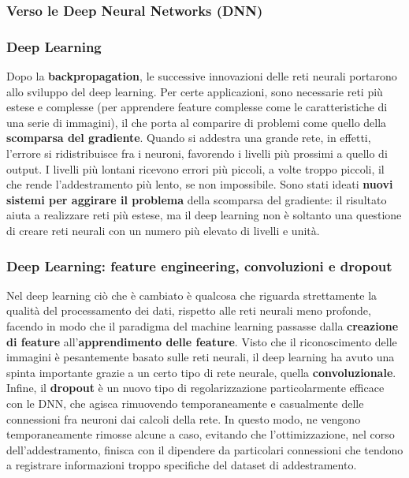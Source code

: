 \subsubsection[Verso le Deep Neural Networks (DNN)]{Verso le Deep Neural Networks (DNN)}
\begin{frame}

	\frametitle{Deep Learning}

	Dopo la \textbf{backpropagation}, le successive innovazioni delle reti neurali portarono allo sviluppo del deep learning.
	\newlinedouble
	Per certe applicazioni, sono necessarie reti più estese e complesse (per apprendere feature complesse come le caratteristiche di una serie di immagini), il che porta al comparire di problemi come quello della \textbf{scomparsa del gradiente}.
	\newlinedouble
	Quando si addestra una grande rete, in effetti, l'errore si ridistribuisce fra i neuroni, favorendo i livelli più prossimi a quello di output. I livelli più lontani ricevono errori più piccoli, a volte troppo piccoli, il che rende l'addestramento più lento, se non impossibile. Sono stati ideati \textbf{nuovi sistemi per aggirare il problema} della scomparsa del gradiente: il risultato aiuta a realizzare reti più estese, ma il deep learning non è soltanto una questione di creare reti neurali con un numero più elevato di livelli e unità.
\end{frame}


\begin{frame}

	\frametitle{Deep Learning: feature engineering, convoluzioni e dropout}

	Nel deep learning ciò che è cambiato è qualcosa che riguarda strettamente la qualità del processamento dei dati, rispetto alle reti neurali meno profonde, facendo in modo che il paradigma del machine learning passasse dalla \textbf{creazione di feature} all'\textbf{apprendimento delle feature}.%
	\newlinedouble
	Visto che il riconoscimento delle immagini è pesantemente basato sulle reti neurali, il deep learning ha avuto una spinta importante grazie a un certo tipo di rete neurale, quella \textbf{convoluzionale}.
	\newlinedouble
	Infine, il \textbf{dropout} è un nuovo tipo di regolarizzazione particolarmente efficace con le DNN, che agisca rimuovendo temporaneamente e casualmente delle connessioni fra neuroni dai calcoli della rete. In questo modo, ne vengono temporaneamente rimosse alcune a caso, evitando che l'ottimizzazione, nel corso dell'addestramento, finisca con il dipendere da particolari connessioni che tendono a registrare informazioni troppo specifiche del dataset di addestramento.

\end{frame}

